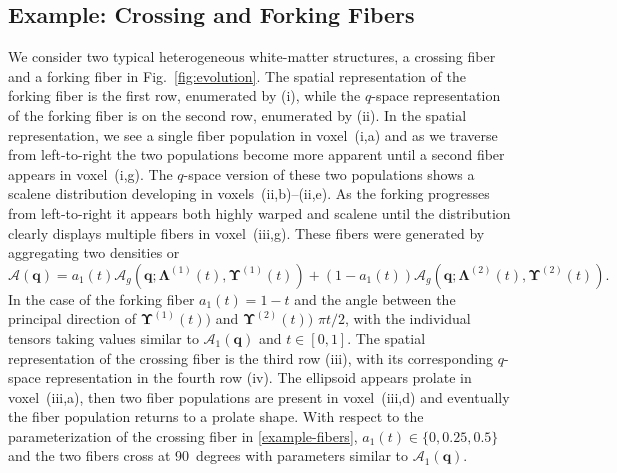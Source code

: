 \documentclass[dvips,aoas,preprint]{imsart}
\numberwithin{equation}{section}
\theoremstyle{plain}
\newcommand{\q}{\mathbf{q}}
\newcommand{\cA}{\mathcal{A}}
\begin{document}
\subsection{Example: Crossing and Forking Fibers}

We consider two typical heterogeneous white-matter structures, a
crossing fiber and a forking fiber in Fig.~\ref{fig:evolution}.  The
spatial representation of the forking fiber is the first row,
enumerated by (i), while the $q$-space representation of the forking
fiber is on the second row, enumerated by (ii).  In the spatial
representation, we see a single fiber population in voxel~(i,a) and as
we traverse from left-to-right the two populations become more
apparent until a second fiber appears in voxel~(i,g).  The $q$-space
version of these two populations shows a scalene distribution
developing in voxels~(ii,b)--(ii,e).  As the forking progresses from
left-to-right it appears both highly warped and scalene until the
distribution clearly displays multiple fibers in voxel~(iii,g).  These
fibers were generated by aggregating two densities or
\begin{equation}\label{example-fibers}
  \cA(\q) = a_1(t) \cA_g(\q; \bm{\Lambda}^{(1)}(t),
  \bm{\Upsilon}^{(1)}(t))+(1-a_1(t)) \cA_g(\q; \bm{\Lambda}^{(2)}(t),
  \bm{\Upsilon}^{(2)}(t)).
\end{equation}
In the case of the forking fiber $a_1(t)=1-t$ and the angle between
the principal direction of $ \bm{\Upsilon}^{(1)}(t))$ and $
\bm{\Upsilon}^{(2)}(t))$ $\pi{t/2}$, with the individual tensors
taking values similar to $\cA_1(\q)$ and $t\in[0,1]$.  The spatial
representation of the crossing fiber is the third row (iii), with its
corresponding $q$-space representation in the fourth row (iv).  The
ellipsoid appears prolate in voxel~(iii,a), then two fiber populations
are present in voxel~(iii,d) and eventually the fiber population
returns to a prolate shape.  With respect to the parameterization of
the crossing fiber in \eqref{example-fibers},
$a_1(t)\in\{0,0.25,0.5\}$ and the two fibers cross at 90~degrees with
parameters similar to $\cA_1(\q)$.
\end{document}
